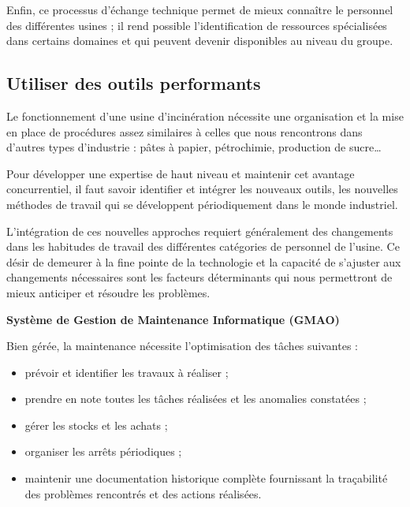 Enfin, ce processus d’échange technique permet de mieux connaître le personnel des différentes usines ; il rend possible l’identification de ressources spécialisées dans certains domaines et qui peuvent devenir disponibles au niveau du groupe.





 
\subsection{Utiliser des outils performants}

Le fonctionnement d’une usine d’incinération nécessite une organisation et la mise en place de procédures assez similaires à celles que nous rencontrons dans d’autres types d’industrie : pâtes à papier, pétrochimie, production de sucre…
\vspace{0.3cm} 

Pour développer une expertise de haut niveau et maintenir cet avantage concurrentiel, il faut savoir identifier et intégrer les nouveaux outils, les nouvelles méthodes de travail qui se développent périodiquement dans le monde industriel.
\vspace{0.3cm} 

L’intégration de ces nouvelles approches requiert généralement des changements dans les habitudes de travail des différentes catégories de personnel de l’usine. Ce désir de demeurer à la fine pointe de la technologie et la capacité de s’ajuster aux changements nécessaires sont les facteurs déterminants qui nous permettront de mieux anticiper et résoudre les problèmes. 

\vspace{0.3cm}
\textbf{Système de Gestion de Maintenance Informatique (GMAO)}
\vspace{0.3cm}

Bien gérée, la maintenance nécessite l’optimisation des tâches suivantes :
\begin{itemize}
\item prévoir et identifier les travaux à réaliser ;
\item prendre en note toutes les tâches réalisées et les anomalies constatées ;
\item gérer les stocks et les achats ;
\item organiser les arrêts périodiques ;
\item maintenir une documentation historique complète fournissant la traçabilité des problèmes rencontrés et des actions réalisées.
\end{itemize}

